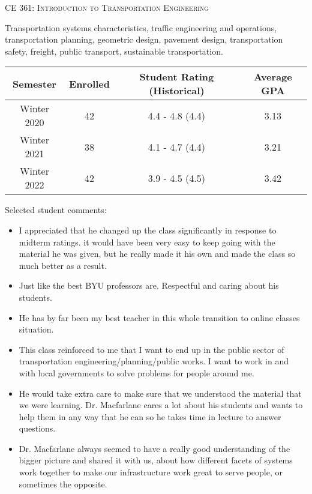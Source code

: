 \documentclass[margin,line]{res}
\newif\ifdetail
\newcommand{\acc}{\scshape }
\begin{document}
\begin{resume}
\fi

\vspace{.4cm}
{\acc CE 361: Introduction to Transportation Engineering}

\vspace{-.4cm}
Transportation systems characteristics, traffic engineering and operations,
transportation planning, geometric design, pavement design, transportation
safety, freight, public transport, sustainable transportation.

\ifdetail
\begin{tabular}{cccc}
  \toprule
  Semester & Enrolled & Student Rating (Historical) & Average GPA\\
  \midrule
  Winter 2020 & 42 & 4.4 - 4.8 (4.4) & 3.13 \\
  Winter 2021 & 38 & 4.1 - 4.7 (4.4) & 3.21 \\
  Winter 2022 & 42 & 3.9 - 4.5 (4.5) & 3.42 \\
  \bottomrule

\end{tabular}

Selected student comments:
\begin{itemize}
  \item I appreciated that he changed up the class significantly in response to midterm
  ratings. it would have been very easy to keep going with the material he was
  given, but he really made it his own and made the class so much better as a
  result.
  \item Just like the best BYU professors are. Respectful and caring about his students.
  \item He has by far been my best teacher in this whole transition to online classes situation.
  \item This class reinforced to me that I want to end up in the public sector of
transportation engineering/planning/public works. I want to work in and with
local governments to solve problems for people around me.
  \item He would take extra care to make sure that we understood the material that we were learning. Dr. Macfarlane cares a lot about his students and wants to help them in any way that he can so he takes time in lecture to answer questions.
  \item Dr. Macfarlane always seemed to have a really good understanding of the bigger picture and shared it with us, about how different facets of systems work together to make our infrastructure work great to serve people, or sometimes the opposite.
\end{itemize}



\end{resume}
\end{document}
